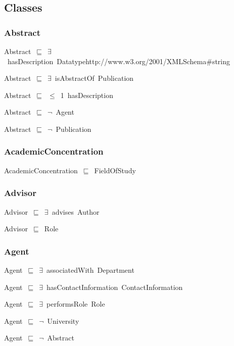 \documentclass{article}
\begin{document}
\subsection*{Classes}

\subsubsection*{Abstract}

Abstract~\ensuremath{\sqsubseteq}~\ensuremath{\exists}~hasDescription~Datatypehttp://www.w3.org/2001/XMLSchema#string~

Abstract~\ensuremath{\sqsubseteq}~\ensuremath{\exists}~isAbstractOf~Publication~

Abstract~\ensuremath{\sqsubseteq}~\ensuremath{\leq}~1~hasDescription~

Abstract~\ensuremath{\sqsubseteq}~\ensuremath{\lnot}~Agent

Abstract~\ensuremath{\sqsubseteq}~\ensuremath{\lnot}~Publication

\subsubsection*{AcademicConcentration}

AcademicConcentration~\ensuremath{\sqsubseteq}~FieldOfStudy~

\subsubsection*{Advisor}

Advisor~\ensuremath{\sqsubseteq}~\ensuremath{\exists}~advises~Author~

Advisor~\ensuremath{\sqsubseteq}~Role~

\subsubsection*{Agent}

Agent~\ensuremath{\sqsubseteq}~\ensuremath{\exists}~associatedWith~Department~

Agent~\ensuremath{\sqsubseteq}~\ensuremath{\exists}~hasContactInformation~ContactInformation~

Agent~\ensuremath{\sqsubseteq}~\ensuremath{\exists}~performsRole~Role~

Agent~\ensuremath{\sqsubseteq}~\ensuremath{\lnot}~University

Agent~\ensuremath{\sqsubseteq}~\ensuremath{\lnot}~Abstract
\end{document}
